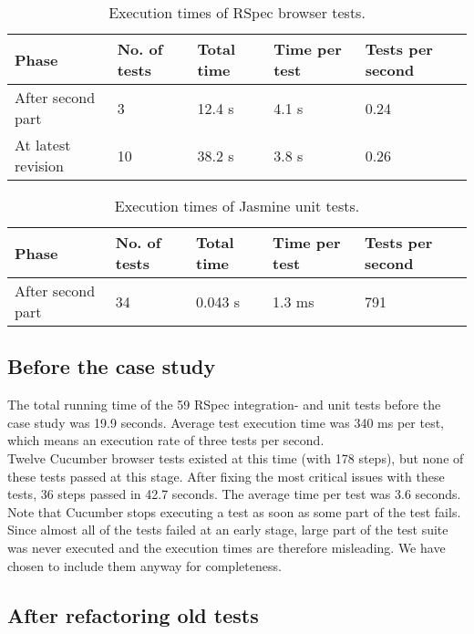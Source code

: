 \begin{table}[t]
    \centering
    \begin{tabular}{l l l l l}
        Phase & No. of tests & Total time & Time per test & Tests per second \\
        \hline
        After second part  & 3  & 12.4 s & 4.1 s & 0.24\\
        At latest revision & 10 & 38.2 s & 3.8 s & 0.26\\
    \end{tabular}
    \caption{ Execution times of RSpec browser tests. }
    \label{tab:rspec_browser_times}
\end{table}

\begin{table}[t]
    \centering
    \begin{tabular}{l l l l l}
        Phase & No. of tests & Total time & Time per test & Tests per second \\
        \hline
        After second part & 34 &  0.043 s & 1.3 ms & 791\\
    \end{tabular}
    \caption{ Execution times of Jasmine unit tests. }
    \label{tab:jasmine_times}
\end{table}


\subsection{Before the case study}

The total running time of the 59 RSpec integration- and unit tests
before the case study was 19.9 seconds. Average test execution time was
340 ms per test, which means an execution rate of three tests per
second.\\

Twelve Cucumber browser tests existed at this time (with 178 steps), but
none of these tests passed at this stage. After fixing the most critical
issues with these tests, 36 steps passed in 42.7 seconds. The average
time per test was 3.6 seconds.\\

Note that Cucumber stops executing a test as soon as some part of the
test fails. Since almost all of the tests failed at an early stage,
large part of the test suite was never executed and the execution times
are therefore misleading. We have chosen to include them anyway for
completeness.\\


\subsection{After refactoring old tests}

